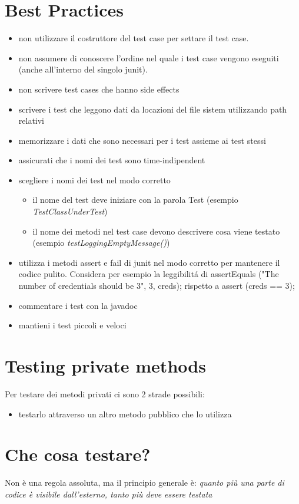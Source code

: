 \documentclass{article}
\begin{document}
\section{Best Practices}
\begin{itemize}
\item non utilizzare il costruttore del test case per settare il test case.
\item non assumere di conoscere l'ordine nel quale i test case vengono eseguiti (anche all'interno del singolo junit).
\item non scrivere test cases che hanno side effects 
\item scrivere i test che leggono dati da locazioni del file sistem utilizzando path relativi
\item memorizzare i dati che sono necessari per i test assieme ai test stessi
\item assicurati che i nomi dei test sono time-indipendent
\item scegliere i nomi dei  test nel modo corretto
\begin{itemize}
\item il nome del test deve iniziare con la parola Test (esempio \emph{TestClassUnderTest})
\item il nome dei metodi nel test case devono descrivere cosa viene testato (esempio \emph{testLoggingEmptyMessage()})
\end{itemize}
\item utilizza i metodi assert e fail di junit nel modo corretto per mantenere il codice pulito. Considera per esempio la leggibilit\' a di assertEquals ("The number of credentials should be 3", 3, creds); rispetto a assert (creds == 3); 
\item commentare i test con la javadoc
\item mantieni i test piccoli e veloci
\end{itemize}

\section{Testing private methods}
Per testare dei metodi privati ci sono 2 strade possibili:
\begin{itemize}
\item testarlo attraverso un altro metodo pubblico che lo utilizza
\end{itemize}

\section{Che cosa testare?}
Non \`e una regola assoluta, ma il principio generale \`e: \emph{quanto pi\`u una parte di codice \`e visibile dall'esterno, tanto pi\`u deve essere testata}
\end{document}

